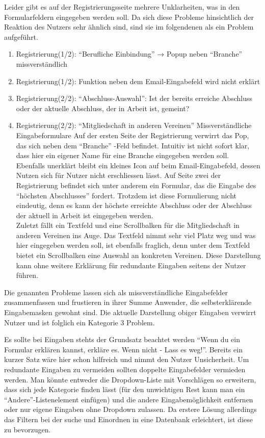 {
Leider gibt es auf der Registrierungsseite mehrere Unklarheiten, was in den Formularfeldern eingegeben werden soll. Da sich diese Probleme hinsichtlich der Reaktion
des Nutzers sehr ähnlich sind, sind sie im folgendenen als ein Problem aufgeführt.

\begin{enumerate}
	\item {Registrierung(1/2): “Berufliche Einbindung” → Popup neben “Branche” missverständlich}
	\item {Registrierung(1/2): Funktion neben dem Email-Eingabefeld wird nicht erklärt}
	\item {Registrierung(2/2): “Abschluss-Auswahl”: Ist der bereits erreiche Abschluss oder der aktuelle Abschluss, der in Arbeit ist, gemeint? }
	\item {Registrierung(2/2): “Mitgliedschaft in anderen Vereinen” Missverständliche Eingabeformulare}	
Auf der ersten Seite der Registrierung verwirrt das Pop, das sich neben dem “Branche” -Feld befindet. Intuitiv ist nicht sofort klar, dass hier ein eigener
Name für eine Branche eingegeben werden soll.\\
Ebenfalls unerklärt bleibt ein kleines Icon auf beim Email-Eingabefeld, dessen Nutzen sich für Nutzer nicht erschliessen lässt.
Auf Seite zwei der Registrierung befindet sich unter anderem ein Formular, das die Eingabe des “höchsten Abschlusses” fordert. Trotzdem ist diese Formulierung nicht eindeutig,
denn es kann der höchste erreichte Abschluss oder der Abschluss der aktuell in Arbeit ist eingegeben werden.\\
Zuletzt fällt ein Textfeld und eine Scrollbalken für die Mitgliedschaft in anderen Vereinen ins Auge. Das Textfeld nimmt sehr viel Platz weg und was hier eingegeben werden soll, ist ebenfalls fraglich, denn unter dem Textfeld bietet ein Scrollbalken eine Auswahl an konkreten Vereinen. Diese Darstellung kann ohne weitere Erklärung für redundante Eingaben seitens der Nutzer führen.
	
\end{enumerate}
}
{Die genannten Probleme lassen sich als missverständliche Eingabefelder zusammenfassen und frustieren in ihrer Summe Anwender, die selbsterklärende Eingabemasken gewohnt sind. Die aktuelle Darstellung obiger Eingaben verwirrt Nutzer und ist folglich ein Kategorie 3 Problem.

}
{
Es sollte bei Eingaben stehts der Grundsatz beachtet werden “Wenn du ein Formular erklären kannst, erkläre es. Wenn nicht - Lass es weg!”. Bereits ein kurzer Satz wäre hier schon hilfreich und nimmt den Nutzer Unsicherheit. Um redundante Eingaben zu vermeiden sollten doppelte Eingabefelder vermieden werden. Man könnte entweder die Dropdown-Liste mit Vorschlägen so erweitern, dass sich jede Kategorie finden lässt (für den unwichtigen Rest kann man ein “Andere”-Listenelement einfügen) und die andere Eingabemöglichkeit entfernen oder nur eigene Eingaben ohne Dropdown zulassen. Da erstere Lösung allerdings das Filtern bei der suche und Einordnen in eine Datenbank erleichtert, ist diese zu bevorzugen.
}
  



